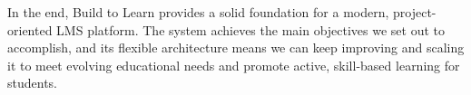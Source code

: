 \documentclass[final,3p,times,twocolumn]{elsarticle}
\begin{document}
In the end, Build to Learn provides a solid foundation for a modern, project-oriented LMS platform. The system achieves the main objectives we set out to accomplish, and its flexible architecture means we can keep improving and scaling it to meet evolving educational needs and promote active, skill-based learning for students.









\end{document}
